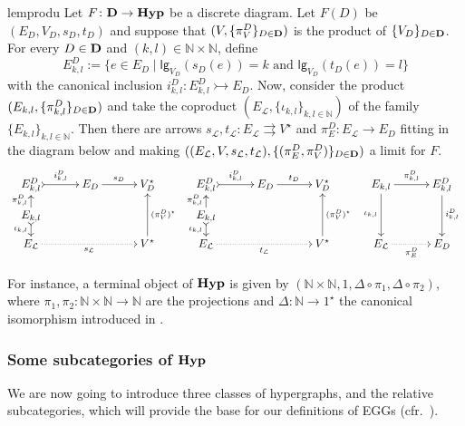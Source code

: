 \documentclass[3p]{elsarticle}
\newcommand{\lgh}{\mathsf{lg}}
\def\D{\textbf {\textup{D}}}
\newcommand{\catname}[1]{\textbf{\textup{#1}}}
\newcommand{\hyp}{\catname{Hyp}}
\newcommand{\mto}{\rightarrowtail}
\theoremstyle{remark}
\theoremstyle{definition}
\begin{document}
	\begin{restatable}{lem}{produ}\label{lem:prod}
		Let $F\colon \D\to \hyp $ be a  discrete diagram. Let $F(D)$ be $(E_D, V_D, s_D,  t_D)$ and suppose that $(V, \{\pi^D_V\}_{D\in \D})$ is the product of $\{V_D\}_{D\in \D}$. For every $D\in \D$ and $(k,l)\in \mathbb{N}\times \mathbb{N}$, define
		\[E^D_{k,l}:=\{e\in E_D \mid \lgh_{V_D}(s_{D}(e)) = k \text{ and } \lgh_{V_D}(t_{D}(e)) = l \}\]
		with the canonical inclusion $i^D_{k,l}\colon E^D_{k,l}\mto E_D$.	Now, consider the product $(E_{k,l}, \{\pi^D_{k,l}\}_{D\in \D})$ and take the coproduct $(E_{\mathcal{L}}, \{\iota_{k,l}\}_{k,l \in \mathbb{N}})$ of the family $\{E_{k,l}\}_{k,l \in \mathbb{N}}$. Then there are arrows $s_{\mathcal{L}}, t_{\mathcal{L}}\colon E_{\mathcal{L}}\rightrightarrows V^\star$ and $\pi^D_E\colon E_{\mathcal{L}}\to E_D$ fitting in the diagram below and making $((E_{\mathcal{L}}, V, s_{\mathcal{L}}, t_{\mathcal{L}}), \{(\pi^D_E, \pi^D_V)\}_{D\in \D})$ a limit for $F$.
		\[\xymatrix@R=10pt@C=30pt{E^D_{k,l} \ar@{>->}[r]^{i^D_{k,l}} & E_D \ar[r]^{s_D} & V^\star_D  &E^D_{k,l} \ar@{>->}[r]^{i^D_{k,l}} & E_D \ar[r]^{t_D} & V^\star_D & E_{k,l} \ar[r]^{\pi^D_{k,l}} \ar[dd]_{\iota_{k,l}} & E^{D}_{k,l} \ar[dd]^{i^D_{k,l}}\\  E_{k,l} \ar@{>->}[d]_{\iota_{k,l}} \ar[u]^{\pi^D_{k,l}}  & & &E_{k,l} \ar@{>->}[d]_{\iota_{k,l}} \ar[u]^{\pi^D_{k,l}}  & & \\  E_{\mathcal{L}}   \ar@{.>}[rr]_{s_\mathcal{L}}& &V^\star \ar[uu]_{(\pi^D_V)^\star} &  E_{\mathcal{L}}   \ar@{.>}[rr]_{t_\mathcal{L}}& &V^\star \ar[uu]_{(\pi^D_V)^\star} & E_{\mathcal{L}} \ar@{.>}[r]_{\pi^D_E} & E_D}
		\]
	\end{restatable}

\begin{exa}\label{ex:term} For instance, a terminal object of $\hyp$ is given by $(\mathbb{N}\times \mathbb{N}, 1, \Delta\circ \pi_1, \Delta\circ \pi_2)$, where $\pi_1, \pi_2\colon \mathbb{N}\times \mathbb{N}\to \mathbb{N}$ are the projections and $\Delta\colon \mathbb{N}\to 1^\star$ the canonical isomorphism introduced in . 
\end{exa}


\subsubsection{Some  subcategories of $\hyp$}

We are now going to introduce three classes of hypergraphs, and the relative subcategories, which will provide the base for our definitions of EGGs  (cfr.~). 
\end{document}
